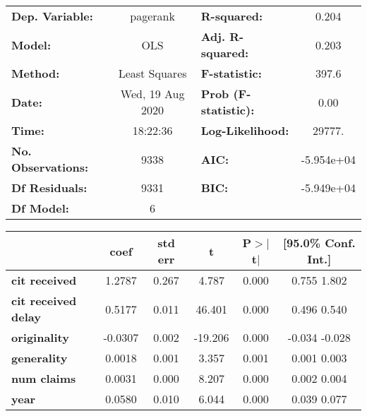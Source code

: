 \begin{center}
\begin{tabular}{lclc}
\toprule
\textbf{Dep. Variable:}     &     pagerank     & \textbf{  R-squared:         } &      0.204    \\
\textbf{Model:}             &       OLS        & \textbf{  Adj. R-squared:    } &      0.203    \\
\textbf{Method:}            &  Least Squares   & \textbf{  F-statistic:       } &      397.6    \\
\textbf{Date:}              & Wed, 19 Aug 2020 & \textbf{  Prob (F-statistic):} &      0.00     \\
\textbf{Time:}              &     18:22:36     & \textbf{  Log-Likelihood:    } &     29777.    \\
\textbf{No. Observations:}  &        9338      & \textbf{  AIC:               } &  -5.954e+04   \\
\textbf{Df Residuals:}      &        9331      & \textbf{  BIC:               } &  -5.949e+04   \\
\textbf{Df Model:}          &           6      & \textbf{                     } &               \\
\bottomrule
\end{tabular}
\begin{tabular}{lccccc}
                            & \textbf{coef} & \textbf{std err} & \textbf{t} & \textbf{P$>$$|$t$|$} & \textbf{[95.0\% Conf. Int.]}  \\
\midrule
\textbf{cit received}       &       1.2787  &        0.267     &     4.787  &         0.000        &         0.755     1.802       \\
\textbf{cit received delay} &       0.5177  &        0.011     &    46.401  &         0.000        &         0.496     0.540       \\
\textbf{originality}        &      -0.0307  &        0.002     &   -19.206  &         0.000        &        -0.034    -0.028       \\
\textbf{generality}         &       0.0018  &        0.001     &     3.357  &         0.001        &         0.001     0.003       \\
\textbf{num claims}         &       0.0031  &        0.000     &     8.207  &         0.000        &         0.002     0.004       \\
\textbf{year}               &       0.0580  &        0.010     &     6.044  &         0.000        &         0.039     0.077       \\
\bottomrule

\end{tabular}
\end{center}

